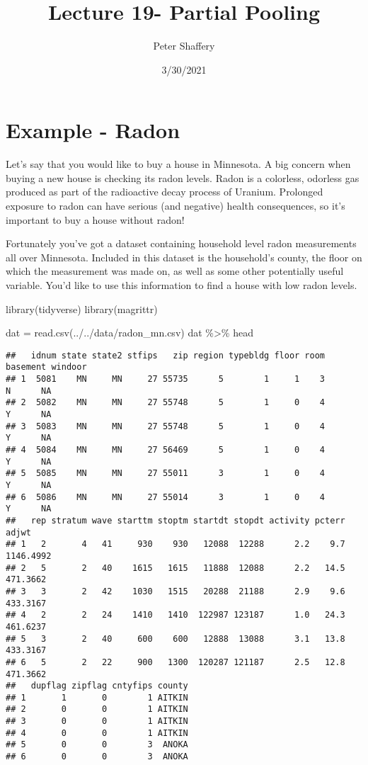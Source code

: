 \documentclass[
]{article}
\title{Lecture 19- Partial Pooling}
\author{Peter Shaffery}
\date{3/30/2021}
\newenvironment{Shaded}{\begin{snugshade}}{\end{snugshade}}
\newcommand{\FunctionTok}[1]{\textcolor[rgb]{0.00,0.00,0.00}{#1}}
\newcommand{\NormalTok}[1]{#1}
\newcommand{\OtherTok}[1]{\textcolor[rgb]{0.56,0.35,0.01}{#1}}
\newcommand{\SpecialCharTok}[1]{\textcolor[rgb]{0.00,0.00,0.00}{#1}}
\newcommand{\StringTok}[1]{\textcolor[rgb]{0.31,0.60,0.02}{#1}}
\begin{document}
\maketitle

\hypertarget{example---radon}{%
\section{Example - Radon}\label{example---radon}}

Let's say that you would like to buy a house in Minnesota. A big concern
when buying a new house is checking its radon levels. Radon is a
colorless, odorless gas produced as part of the radioactive decay
process of Uranium. Prolonged exposure to radon can have serious (and
negative) health consequences, so it's important to buy a house without
radon!

Fortunately you've got a dataset containing household level radon
measurements all over Minnesota. Included in this dataset is the
household's county, the floor on which the measurement was made on, as
well as some other potentially useful variable. You'd like to use this
information to find a house with low radon levels.

\begin{Shaded}
\begin{Highlighting}[]
\FunctionTok{library}\NormalTok{(tidyverse)}
\FunctionTok{library}\NormalTok{(magrittr)}

\NormalTok{dat }\OtherTok{=} \FunctionTok{read.csv}\NormalTok{(}\StringTok{\textquotesingle{}../../data/radon\_mn.csv\textquotesingle{}}\NormalTok{)}
\NormalTok{dat }\SpecialCharTok{\%\textgreater{}\%}\NormalTok{ head}
\end{Highlighting}
\end{Shaded}

\begin{verbatim}
##   idnum state state2 stfips   zip region typebldg floor room basement windoor
## 1  5081    MN     MN     27 55735      5        1     1    3        N      NA
## 2  5082    MN     MN     27 55748      5        1     0    4        Y      NA
## 3  5083    MN     MN     27 55748      5        1     0    4        Y      NA
## 4  5084    MN     MN     27 56469      5        1     0    4        Y      NA
## 5  5085    MN     MN     27 55011      3        1     0    4        Y      NA
## 6  5086    MN     MN     27 55014      3        1     0    4        Y      NA
##   rep stratum wave starttm stoptm startdt stopdt activity pcterr     adjwt
## 1   2       4   41     930    930   12088  12288      2.2    9.7 1146.4992
## 2   5       2   40    1615   1615   11888  12088      2.2   14.5  471.3662
## 3   3       2   42    1030   1515   20288  21188      2.9    9.6  433.3167
## 4   2       2   24    1410   1410  122987 123187      1.0   24.3  461.6237
## 5   3       2   40     600    600   12888  13088      3.1   13.8  433.3167
## 6   5       2   22     900   1300  120287 121187      2.5   12.8  471.3662
##   dupflag zipflag cntyfips county
## 1       1       0        1 AITKIN
## 2       0       0        1 AITKIN
## 3       0       0        1 AITKIN
## 4       0       0        1 AITKIN
## 5       0       0        3  ANOKA
## 6       0       0        3  ANOKA
\end{verbatim}
\end{document}
